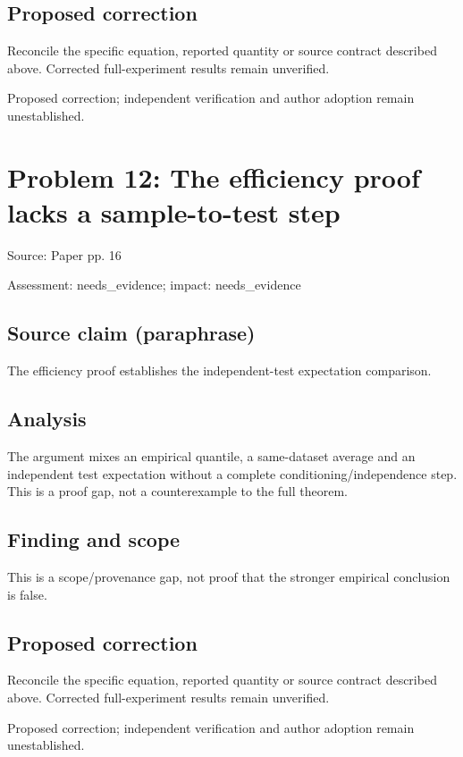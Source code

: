 \documentclass[11pt]{article}
\begin{document}
\subsection*{Proposed correction}

Reconcile the specific equation, reported quantity or source contract described above. Corrected full-experiment results remain unverified.

Proposed correction; independent verification and author adoption remain unestablished.

\section*{Problem 12: The efficiency proof lacks a sample-to-test step}

Source: Paper pp. 16

Assessment: needs\_evidence; impact: needs\_evidence

\subsection*{Source claim (paraphrase)}

The efficiency proof establishes the independent-test expectation comparison.

\subsection*{Analysis}

The argument mixes an empirical quantile, a same-dataset average and an independent test expectation without a complete conditioning/independence step. This is a proof gap, not a counterexample to the full theorem.

\subsection*{Finding and scope}

This is a scope/provenance gap, not proof that the stronger empirical conclusion is false.

\subsection*{Proposed correction}

Reconcile the specific equation, reported quantity or source contract described above. Corrected full-experiment results remain unverified.

Proposed correction; independent verification and author adoption remain unestablished.
\end{document}
